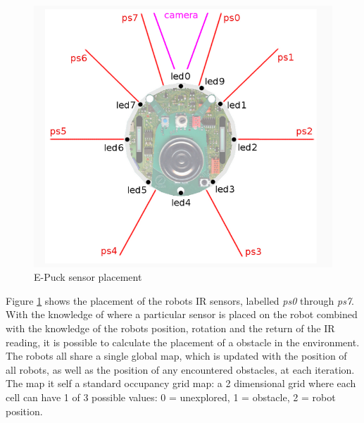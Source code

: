 \begin{figure}[h]
\begin{center}
\includegraphics[scale=0.4]{Chapter1/images/e_puck_sensor.png}
\caption{E-Puck sensor placement}
\label{fig:sensor_placement} 
\end{center}
\end{figure}

Figure \ref{fig:sensor_placement} shows the placement of the robots IR sensors, labelled \textit{ps0} through \textit{ps7}.\\
With the knowledge of where a particular sensor is placed on the robot combined with the knowledge of the robots position, rotation and the return of the IR reading, it is possible to calculate the placement of a obstacle in the environment.\\

The robots all share a single global map, which is updated with the position of all robots, as well as the position of any encountered obstacles, at each iteration. \\
The map it self a standard occupancy grid map: a 2 dimensional grid where each cell can have 1 of 3 possible values: 0 = unexplored, 1 = obstacle, 2 = robot position.  

